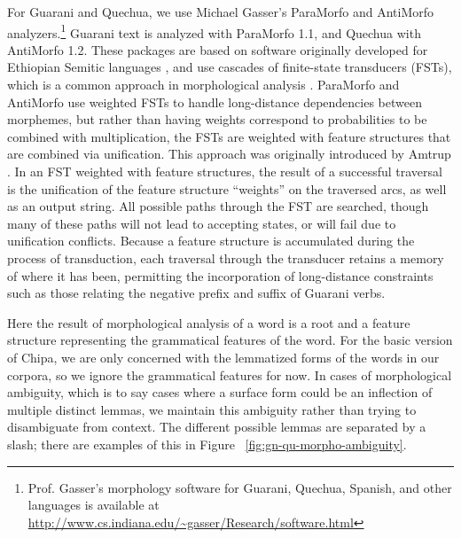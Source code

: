 For Guarani and Quechua, we use Michael Gasser's ParaMorfo and AntiMorfo
analyzers.\footnote{Prof. Gasser's morphology software for Guarani, Quechua,
Spanish, and other languages is available at
\url{http://www.cs.indiana.edu/~gasser/Research/software.html}} Guarani text is
analyzed with ParaMorfo 1.1, and Quechua with AntiMorfo 1.2.  These packages
are based on software originally developed for Ethiopian Semitic languages
\cite{gasser:eacl09}, and use cascades of finite-state transducers (FSTs),
which is a common approach in morphological analysis \cite{beesley+karttunen}.
ParaMorfo and AntiMorfo use weighted FSTs to handle long-distance dependencies
between morphemes, but rather than having weights correspond to probabilities
to be combined with multiplication, the FSTs are weighted with feature
structures that are combined via unification. This approach was originally
introduced by Amtrup \cite{amtrup:03}. In an FST weighted with feature
structures, the result of a successful traversal is the unification of the
feature structure ``weights'' on the traversed arcs, as well as an output
string. All possible paths through the FST are searched, though many of these
paths will not lead to accepting states, or will fail due to unification
conflicts.  Because a feature structure is accumulated during the process of
transduction, each traversal through the transducer retains a memory of where
it has been, permitting the incorporation of long-distance constraints such as
those relating the negative prefix and suffix of Guarani verbs.

Here the result of morphological analysis of a word is a root and a feature
structure representing the grammatical features of the word.  For the basic
version of Chipa, we are only concerned with the lemmatized forms of the words
in our corpora, so we ignore the grammatical features for now.  In cases of
morphological ambiguity, which is to say cases where a surface form could be an
inflection of multiple distinct lemmas, we maintain this ambiguity rather than
trying to disambiguate from context.  The different possible lemmas are
separated by a slash; there are examples of this in
Figure ~\ref{fig:gn-qu-morpho-ambiguity}.

